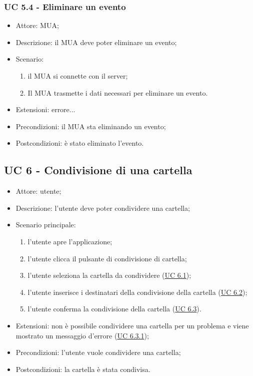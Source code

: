     \subsubsection{UC 5.4 - Eliminare un evento} \label{sec: UC 5.4}
    \begin{itemize}
        \item Attore: MUA;
        \item Descrizione: il MUA deve poter eliminare un evento;
        \item Scenario:
        \begin{enumerate}
        \item il MUA si connette con il server;
        \item Il MUA trasmette i dati necessari per eliminare un evento.
        \end{enumerate}
        \item Estensioni: errore...
        \item Precondizioni: il MUA sta eliminando un evento;
        \item Postcondizioni: è stato eliminato l'evento.
    \end{itemize}



    \subsection{UC 6 - Condivisione di una cartella}
    \begin{itemize}
        \item Attore: utente;
        \item Descrizione: l'utente deve poter condividere una cartella;
        \item Scenario principale:
            \begin{enumerate}
            \item l’utente apre l’applicazione;
            \item l’utente clicca il pulsante di condivisione di cartella;
            \item l'utente seleziona la cartella da condividere (\hyperref[sec: UC 6.1]{UC 6.1});
            \item l'utente inserisce i destinatari della condivisione della cartella (\hyperref[sec: UC 6.2]{UC 6.2});  
            \item l'utente conferma la condivisione della cartella (\hyperref[sec: UC 6.3]{UC 6.3}).          
            \end{enumerate}
        \item Estensioni: non è possibile condividere una cartella per un problema e viene mostrato un messaggio d'errore (\hyperref[sec: UC 6.3.1]{UC 6.3.1});
        \item Precondizioni: l'utente vuole condividere una cartella;
        \item Postcondizioni: la cartella è stata condivisa.
    \end{itemize}

